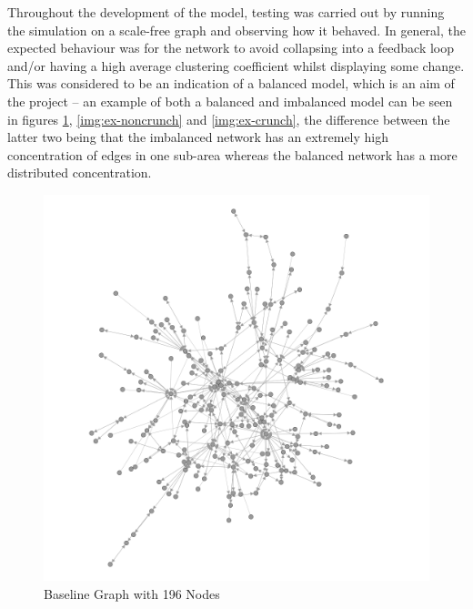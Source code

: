 \documentclass[]{report}
\begin{document}
Throughout the development of the model, testing was carried out by running the simulation on a scale-free graph and observing how it behaved. In general, the expected behaviour was for the network to avoid collapsing into a feedback loop and/or having a high average clustering coefficient whilst displaying some change. This was considered to be an indication of a balanced model, which is an aim of the project – an example of both a balanced and imbalanced model can be seen in figures \ref{img:ex-simbase}, \ref{img:ex-noncrunch} and \ref{img:ex-crunch}, the difference between the latter two being that the imbalanced network has an extremely high concentration of edges in one sub-area whereas the balanced network has a more distributed concentration.

\begin{figure}

\begin{center}
\includegraphics[scale=0.4]{simbase.png}
\end{center}
\caption{Baseline Graph with 196 Nodes}
\label{img:ex-simbase}
\end{figure}
\end{document}
